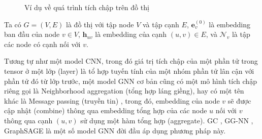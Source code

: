 \begin{figure}[H]
{
    }
    \caption{Ví dụ về quá trình tích chập trên đồ thị}
\end{figure}

\noindent Ta có $G = (V, E)$ là đồ thị với tập node $V$ và tập cạnh $E$, $\mathbf{e}_v^{(0)}$ là embedding ban đầu của node $v \in V$, $\mathbf{h}_{uv}$ là embedding của cạnh $(u, v) \in E$, và $\mathcal{N}_v$ là tập các node có cạnh nối với $v$.

Tương tự như một model CNN, trong đó giá trị tích chập của một phần tử trong tensor ở một lớp (layer) là tổ hợp tuyến tính của một nhóm phần tử lân cận với phần tử đó từ lớp trước, một model GNN cơ bản cũng có một mô hình tích chập riêng gọi là Neighborhood aggregation (tổng hợp láng giềng), hay có một tên khác là Message passing (truyền tin) \cite{messagepassing-quantum-chemistry}, trong đó, embedding của node $v$ sẽ được cập nhật (combine) thông qua embedding tổng hợp của các node $u$ nối với $v$ thông qua cạnh $(u, v)$ sử dụng một hàm tổng hợp (aggregate). GC \cite{GC-model}, GG-NN \cite{GG-NN}, GraphSAGE \cite{GraphSAGE} là một số model GNN đời đầu áp dụng phương pháp này.

